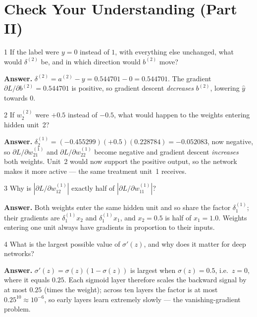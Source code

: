 \documentclass[11pt]{article}
\begin{document}
\section{Check Your Understanding (Part II)}
\begin{question}{1}
If the label were $y=0$ instead of $1$, with everything else unchanged, what would $\delta^{(2)}$ be, and in which direction would $b^{(2)}$ move?
\end{question}
\textbf{Answer.} $\delta^{(2)}=a^{(2)}-y=0.544701-0=0.544701$. The gradient $\partial L/\partial b^{(2)}=0.544701$ is positive, so gradient descent \emph{decreases} $b^{(2)}$, lowering $\hat y$ towards 0.

\begin{question}{2}
If $w^{(2)}_2$ were $+0.5$ instead of $-0.5$, what would happen to the weights entering hidden unit~2?
\end{question}
\textbf{Answer.} $\delta^{(1)}_2=(-0.455299)(+0.5)(0.228784)=-0.052083$, now negative, so $\partial L/\partial w^{(1)}_{21}$ and $\partial L/\partial w^{(1)}_{22}$ become negative and gradient descent \emph{increases} both weights. Unit~2 would now support the positive output, so the network makes it more active --- the same treatment unit~1 receives.

\begin{question}{3}
Why is $|\partial L/\partial w^{(1)}_{12}|$ exactly half of $|\partial L/\partial w^{(1)}_{11}|$?
\end{question}
\textbf{Answer.} Both weights enter the same hidden unit and so share the factor $\delta^{(1)}_1$; their gradients are $\delta^{(1)}_1x_2$ and $\delta^{(1)}_1x_1$, and $x_2=0.5$ is half of $x_1=1.0$. Weights entering one unit always have gradients in proportion to their inputs.

\begin{question}{4}
What is the largest possible value of $\sigma'(z)$, and why does it matter for deep networks?
\end{question}
\textbf{Answer.} $\sigma'(z)=\sigma(z)(1-\sigma(z))$ is largest when $\sigma(z)=0.5$, i.e.\ $z=0$, where it equals $0.25$. Each sigmoid layer therefore scales the backward signal by at most $0.25$ (times the weight); across ten layers the factor is at most $0.25^{10}\approx10^{-6}$, so early layers learn extremely slowly --- the vanishing-gradient problem.
\end{document}
